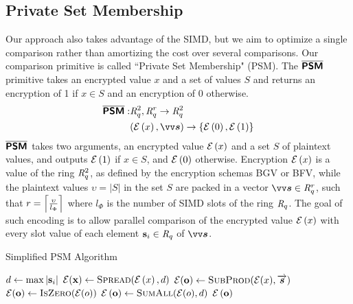 \subsection{Private Set Membership}\label{sec:psm}
Our approach also takes advantage of the \ac{SIMD}, but we aim to optimize a single comparison rather than amortizing the cost over several comparisons. Our comparison primitive is called ``Private Set Membership" (PSM). The $\overline{\textsf{\textbf{PSM}}}$ primitive takes an encrypted value $x$ and a set of values $S$ and returns an encryption of 1 if $x\in S$ and an encryption of 0 otherwise.
\begin{equation} \label{eq:psm}
\begin{split}
\PSM: &\intring_q^2,\intring_q^r \rightarrow \intring_q^2\\
      &(\enc{x},\pv{s}) \rightarrow \{\enc{0},\enc{1}\}
\end{split}
\end{equation}
$\overline{\textsf{\textbf{PSM}}}$ takes two arguments, an encrypted value $\mathcal{E}\left({x}\right)$ and a set $S$ of plaintext values, and outputs $\mathcal{E}\left({1}\right)$ if $x \in S$, and $\mathcal{E}\left({0}\right)$ otherwise. Encryption $\mathcal{E}\left({x}\right)$ is a value of the ring $\mathit{R}_q^2$, as defined by the encryption schemas BGV or BFV, while the plaintext values $\upsilon=|S|$ in the set $S$ are packed in a vector $\pv{s} \in \intring_q^r$,  such that $r=\left\lceil \frac{\upsilon}{l_{\Phi}} \right\rceil$ where $l_{\Phi}$ is the number of \ac{SIMD} slots of the ring $\mathit{R}_q$. The goal of such encoding is to allow parallel comparison of the encrypted value $\mathcal{E}\left({x}\right)$ with every slot value of each element $\mathbf{s}_i \in \mathit{R}_q$ of $\pv{s}$.

\begin{algorithm}
\caption{Simplified PSM Algorithm}\label{alg:psm}
\small
\begin{algorithmic}
    \State $d \gets \max{|\mathbf{s}_i|}$ 
	\State $\encv{\px} \gets \Call{Spread}{\enc{x},d}$
	\State $\encv{\po} \gets \Call{SubProd}{\encv{x}, \overrightarrow{\bm{s}}}$ 
	\State $\encv{\po} \gets \Call{IsZero}{\encv{o}}$
	\State $\enc{\po} \gets \Call{SumAll}{\encv{o},d}$ 
    \State \Return $\mathcal{E}\left({\mathbf{o}}\right)$
\EndProcedure
\end{algorithmic}
\end{algorithm}

